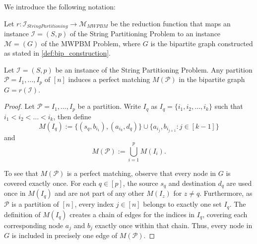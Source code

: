 We introduce the following notation:
\begin{definition}
    Let $r:\mathcal{I}_{String Partitioning} \rightarrow \mathcal{M}_{MWPBM}$ be the reduction function that maps an instance $\mathcal{I}=(S, p)$ of the String Partitioning Problem to an instance $\mathcal{M}=(G)$ of the MWPBM Problem, where $G$ is the bipartite graph constructed as stated in \cref{def:bip_construction}.
\end{definition}

\begin{lemma} \label{lemma:partition_induces_matching}
    Let $\mathcal{I}=(S, p)$ be an instance of the String Partitioning Problem. Any partition $\mathcal{P}=I_1,\dots,I_p$ of $[n]$ induces a perfect matching $M(\mathcal{P})$ in the bipartite graph $G = r(\mathcal{I})$.
\end{lemma}
\begin{proof}
    Let $\mathcal{P}=I_1,\dots,I_p$ be a partition. Write $I_q$ as $I_q = \{i_1, i_2, \dots, i_k\}$ such that $i_1 <i_2<\dots<i_k$, then define 
    $$
        M(I_q) := \{(s_q, b_{i_1}), (a_{i_k}, d_q)\} \cup \{a_{i_j}, b_{i_{j+1}} : j \in [k-1]\}
    $$
    and 
    $$
        M(\mathcal{P}) := \bigcup_{i=1}^p M(I_i).
    $$
    
    To see that $M(\mathcal{P})$ is a perfect matching, observe that every node in $G$ is covered exactly once. For each $q \in [p]$, the source $s_q$ and destination $d_q$ are used once in $M(I_q)$ and are not part of any other $M(I_z)$ for $z \neq q$. Furthermore, as $\mathcal{P}$ is a partition of $[n]$, every index $j \in [n]$ belongs to exactly one set $I_q$. The definition of $M(I_q)$ creates a chain of edges for the indices in $I_q$, covering each corresponding node $a_j$ and $b_j$ exactly once within that chain. Thus, every node in $G$ is included in precisely one edge of $M(\mathcal{P})$.
\end{proof}

